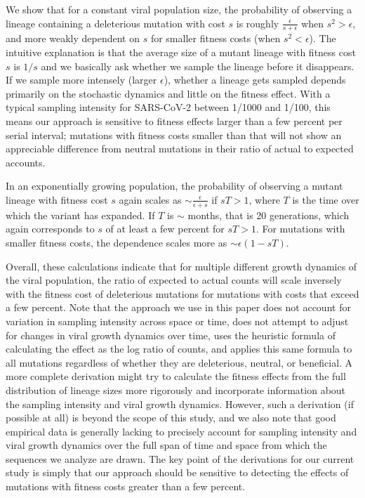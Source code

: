 \documentclass[9pt,twocolumn,twoside]{gsajnl_modified}
\begin{document}
{We show that for a constant viral population size, the probability of observing a lineage containing a deleterious mutation with cost $s$ is roughly $\frac{\epsilon}{s + \epsilon}$ when $s^2 > \epsilon$, and more weakly dependent on $s$ for smaller fitness costs (when $s^2 < \epsilon$).
The intuitive explanation is that the average size of a mutant lineage with fitness cost $s$ is $1/s$ and we basically ask whether we sample the lineage before it disappears.
If we sample more intensely (larger $\epsilon$), whether a lineage gets sampled depends primarily on the stochastic dynamics and little on the fitness effect.
With a typical sampling intensity for SARS-CoV-2 between 1/1000 and 1/100, this means our approach is sensitive to fitness effects larger than a few percent per serial interval; mutations with fitness costs smaller than that will not show an appreciable difference from neutral mutations in their ratio of actual to expected accounts.

In an exponentially growing population, the probability of observing a mutant lineage with fitness cost $s$ again scales as $\sim \frac{\epsilon}{\epsilon + s}$ if $sT>1$, where $T$ is the time over which the variant has expanded.
If $T$ is $\sim$ months, that is 20 generations, which again corresponds to $s$ of at least a few percent for $sT > 1$.
For mutations with smaller fitness costs, the dependence scales more as $\sim \epsilon\left(1-sT\right)$.

Overall, these calculations indicate that for multiple different growth dynamics of the viral population, the ratio of expected to actual counts will scale inversely with the fitness cost of deleterious mutations for mutations with costs that exceed a few percent.
Note that the approach we use in this paper does not account for variation in sampling intensity across space or time, does not attempt to adjust for changes in viral growth dynamics over time, uses the heuristic formula of calculating the effect as the log ratio of counts, and applies this same formula to all mutations regardless of whether they are deleterious, neutral, or beneficial.
A more complete derivation might try to calculate the fitness effects from the full distribution of lineage sizes more rigorously and incorporate information about the sampling intensity and viral growth dynamics.
However, such a derivation (if possible at all) is beyond the scope of this study, and we also note that good empirical data is generally lacking to precisely account for sampling intensity and viral growth dynamics over the full span of time and space from which the sequences we analyze are drawn.
The key point of the derivations for our current study is simply that our approach should be sensitive to detecting the effects of mutations with fitness costs greater than a few percent.

}
\end{document}
